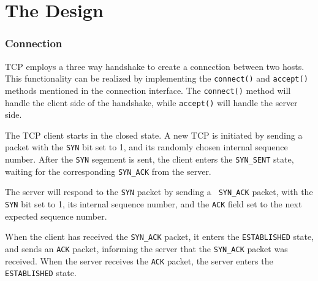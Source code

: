 \documentclass{article}
\begin{document}
\part{The Design}

\section{Connection}

TCP employs a three way handshake to create a connection between two hosts.
This functionality can be realized by implementing the \texttt{connect()}
and \texttt{accept()} methods mentioned in the connection interface. The 
\texttt{connect()} method will handle the client side of the handshake,
while \texttt{accept()} will handle the server side.

The TCP client starts in the closed state. A new TCP is initiated by sending
a packet with the \texttt{SYN} bit set to 1, and its randomly chosen
internal sequence number. After the \texttt{SYN} segement is sent, the
client enters the \texttt{\texttt{SYN}\_SENT} state, waiting for the
corresponding \texttt{\texttt{SYN}\_ACK} from the server.

The server will respond to the \texttt{SYN} packet by sending a \texttt{%
\texttt{SYN}\_ACK} packet, with the \texttt{SYN} bit set to 1, its internal
sequence number, and the \texttt{ACK} field set to the next expected
sequence number.

When the client has received the \texttt{\texttt{SYN}\_ACK} packet, it
enters the \texttt{ESTABLISHED} state, and sends an \texttt{ACK} packet,
informing the server that the \texttt{\texttt{SYN}\_ACK} packet was
received. When the server receives the \texttt{ACK} packet, the server
enters the \texttt{ESTABLISHED} state.
\end{document}
